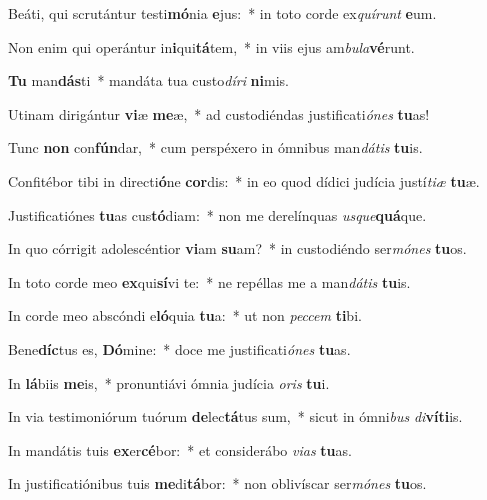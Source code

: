 \item Beáti, qui scrutántur testi\textbf{mó}nia \textbf{e}jus:~* in toto corde ex\textit{quí}\textit{runt} \textbf{e}um.
\item Non enim qui operántur in\textbf{i}qui\textbf{tá}tem,~* in viis ejus am\textit{bu}\textit{la}\textbf{vé}runt.
\item \textbf{Tu} man\textbf{dás}ti~* mandáta tua custo\textit{dí}\textit{ri} \textbf{ni}mis.
\item Utinam dirigántur \textbf{vi}æ \textbf{me}æ,~* ad custodiéndas justificati\textit{ó}\textit{nes} \textbf{tu}as!
\item Tunc \textbf{non} con\textbf{fún}dar,~* cum perspéxero in ómnibus man\textit{dá}\textit{tis} \textbf{tu}is.
\item Confitébor tibi in directi\textbf{ó}ne \textbf{cor}dis:~* in eo quod dídici judícia justí\textit{ti}\textit{æ} \textbf{tu}æ.
\item Justificatiónes \textbf{tu}as cus\textbf{tó}diam:~* non me derelínquas \textit{us}\textit{que}\textbf{quá}que.
\item In quo córrigit adolescéntior \textbf{vi}am \textbf{su}am?~* in custodiéndo ser\textit{mó}\textit{nes} \textbf{tu}os.
\item In toto corde meo \textbf{ex}qui\textbf{sí}vi te:~* ne repéllas me a man\textit{dá}\textit{tis} \textbf{tu}is.
\item In corde meo abscóndi e\textbf{ló}quia \textbf{tu}a:~* ut non \textit{pec}\textit{cem} \textbf{ti}bi.
\item Bene\textbf{díc}tus es, \textbf{Dó}mine:~* doce me justificati\textit{ó}\textit{nes} \textbf{tu}as.
\item In \textbf{lá}biis \textbf{me}is,~* pronuntiávi ómnia judícia \textit{o}\textit{ris} \textbf{tu}i.
\item In via testimoniórum tuórum \textbf{de}lec\textbf{tá}tus sum,~* sicut in ómni\textit{bus} \textit{di}\textbf{ví}\textbf{ti}is.
\item In mandátis tuis \textbf{ex}er\textbf{cé}bor:~* et considerábo \textit{vi}\textit{as} \textbf{tu}as.
\item In justificatiónibus tuis \textbf{me}di\textbf{tá}bor:~* non oblivíscar ser\textit{mó}\textit{nes} \textbf{tu}os.
